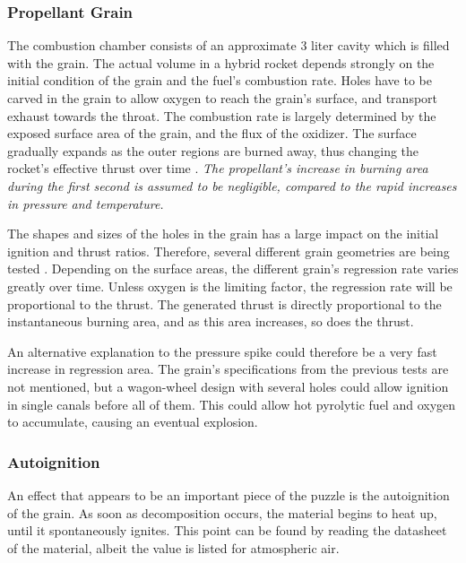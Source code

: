 	\subsubsection{Propellant Grain}
		The combustion chamber consists of an approximate 3 liter cavity which is filled with the grain. The actual volume in a hybrid rocket depends strongly on the initial condition of the grain and the fuel's combustion rate. Holes have to be carved in the grain to allow oxygen to reach the grain's surface, and transport exhaust towards the throat. The combustion rate is largely determined by the exposed surface area of the grain, and the flux of the oxidizer. The surface gradually expands as the outer regions are burned away, thus changing the rocket's effective thrust over time \cite[chapter 12, p.~174]{ignition}. \emph{The propellant's increase in burning area during the first second is assumed to be negligible, compared to the rapid increases in pressure and temperature.}

		The shapes and sizes of the holes in the grain has a large impact on the initial ignition and thrust ratios. \cite{nakka} Therefore, several different grain geometries are being tested . Depending on the surface areas, the different grain's regression rate varies greatly over time. Unless oxygen is the limiting factor, the regression rate will be proportional to the thrust. The generated thrust is directly proportional to the instantaneous burning area, and as this area increases, so does the thrust.

		An alternative explanation to the pressure spike could therefore be a very fast increase in regression area. The grain's specifications from the previous tests are not mentioned, but a wagon-wheel design with several holes could allow ignition in single canals before all of them. This could allow hot pyrolytic fuel and oxygen to accumulate, causing an eventual explosion.

	\subsubsection{Autoignition}

		An effect that appears to be an important piece of the puzzle is the autoignition of the grain. As soon as decomposition occurs, the material begins to heat up, until it spontaneously ignites. This point can be found by reading the datasheet of the material, albeit the value is listed for atmospheric air.


